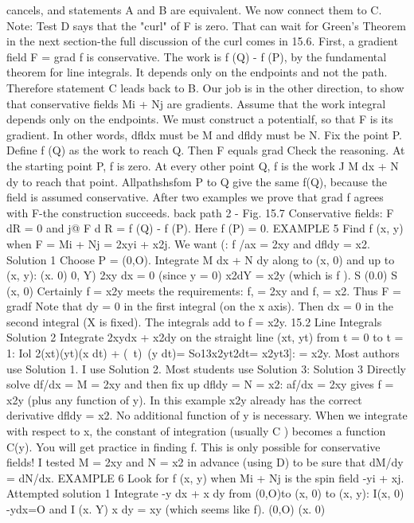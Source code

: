 cancels, and statements A and B are equivalent. We now connect them to C. Note:
Test D says that the "curl" of F is zero. That can wait for Green's Theorem in the
next section-the full discussion of the curl comes in 15.6.
First, a gradient field F = grad f is conservative. The work is f (Q) - f (P), by the
fundamental theorem for line integrals. It depends only on the endpoints and not the
path. Therefore statement C leads back to B.
Our job is in the other direction, to show that conservative fields Mi + Nj are
gradients. Assume that the work integral depends only on the endpoints. We must
construct a potentialf, so that F is its gradient. In other words, dfldx must be M and
dfldy must be N.
Fix the point P. Define f (Q) as the work to reach Q. Then F equals grad
Check the reasoning. At the starting point P, f is zero. At every other point Q, f is
the work J M dx + N dy to reach that point. Allpathshsfom P to Q give the same f(Q),
because the field is assumed conservative. After two examples we prove that grad f
agrees with F-the construction succeeds.
back path 2 -
Fig. 15.7 Conservative fields:  F dR = 0 and j@ F d R = f (Q) - f (P). Here f (P) = 0.
EXAMPLE 5 Find f (x, y) when F = Mi + Nj = 2xyi + x2j. We want (: f /ax = 2xy
and dfldy = x2.
Solution 1 Choose P = (0,O). Integrate M dx + N dy along to (x, 0) and up to (x, y):
(x. 0) 0, Y)
2xy dx = 0 (since y = 0) x2dY = x2y (which is f ). S (0.0) S (x, 0)
Certainly f = x2y meets the requirements: f, = 2xy and f, = x2. Thus F = gradf Note
that dy = 0 in the first integral (on the x axis). Then dx = 0 in the second integral
(X is fixed). The integrals add to f = x2y. 
15.2 Line Integrals
Solution 2 Integrate 2xydx + x2dy on the straight line (xt, yt) from t = 0 to t = 1:
Iol 2(xt)(yt)(x dt) + (~t)~(y dt)= So13x2yt2dt= x2yt3]: = x2y.
Most authors use Solution 1. I use Solution 2. Most students use Solution 3:
Solution 3 Directly solve df/dx = M = 2xy and then fix up dfldy = N = x2:
af/dx = 2xy gives f = x2y (plus any function of y).
In this example x2y already has the correct derivative dfldy = x2. No additional
function of y is necessary. When we integrate with respect to x, the constant of
integration (usually C ) becomes a function C(y).
You will get practice in finding f. This is only possible for conservative fields! I
tested M = 2xy and N = x2 in advance (using D) to be sure that dM/dy = dN/dx.
EXAMPLE 6 Look for f (x, y) when Mi + Nj is the spin field -yi + xj.
Attempted solution 1 Integrate -y dx + x dy from (0,O)to (x, 0) to (x, y):
I(x, 0)
-ydx=O and I
(x. Y)
x dy = xy (which seems like f).
(0,O) (x. 0)
